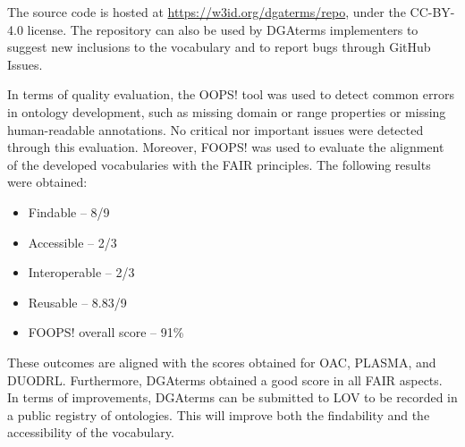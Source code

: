 The source code is hosted at \url{https://w3id.org/dgaterms/repo}, under the CC-BY-4.0 license.
The repository can also be used by DGAterms implementers to suggest new inclusions to the vocabulary and to report bugs through GitHub Issues.

In terms of quality evaluation, the OOPS! tool was used to detect common errors in ontology development, such as missing domain or range properties or missing human-readable annotations.
No critical nor important issues were detected through this evaluation.
Moreover, FOOPS! was used to evaluate the alignment of the developed vocabularies with the FAIR principles.
The following results were obtained:
\begin{itemize}
    \item Findable -- 8/9
    \item Accessible -- 2/3
    \item Interoperable -- 2/3
    \item Reusable -- 8.83/9
    \item FOOPS! overall score -- 91\%
\end{itemize}
These outcomes are aligned with the scores obtained for OAC, PLASMA, and DUODRL.
Furthermore, DGAterms obtained a good score in all FAIR aspects.
In terms of improvements, DGAterms can be submitted to LOV to be recorded in a public registry of ontologies.
This will improve both the findability and the accessibility of the vocabulary.
